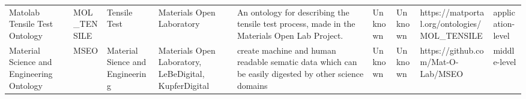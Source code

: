\begin{tabular}{m{5cm}m{2cm}m{5cm}m{2cm}m{2cm}m{2cm}m{2cm}m{2cm}m{2cm}}
                                                    Matolab Tensile Test Ontology &             MOL_TENSILE &                                Tensile Test &                                                                                                                                                                                                                                                                                                                                            Materials Open Laboratory &                                                                                                                                                                                                                                                                                                           An ontology for describing the tensile test process, made in the Materials Open Lab Project. &                                                                                                            Unknown &                                      Unknown &                                                       https://matportal.org/ontologies/MOL_TENSILE & application-level \\
                                        Material Science and Engineering Ontology &                    MSEO &             Material Sience and Engineering &                                                                                                                                                                                                                                                                                                                Materials Open Laboratory, LeBeDigital, KupferDigital &                                                                                                                                                                                                                                                                                                   create machine and human readable sematic data which can be easily digested by other science domains &                                                                                                            Unknown &                                      Unknown &                                                                  https://github.com/Mat-O-Lab/MSEO &      middle-level \\

\end{tabular}
